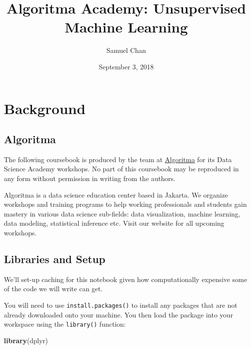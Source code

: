 \documentclass[]{article}
\title{Algoritma Academy: Unsupervised Machine Learning}
\author{Samuel Chan}
\date{September 3, 2018}
\newenvironment{Shaded}{\begin{snugshade}}{\end{snugshade}}
\newcommand{\DataTypeTok}[1]{\textcolor[rgb]{0.13,0.29,0.53}{#1}}
\newcommand{\DecValTok}[1]{\textcolor[rgb]{0.00,0.00,0.81}{#1}}
\newcommand{\KeywordTok}[1]{\textcolor[rgb]{0.13,0.29,0.53}{\textbf{#1}}}
\newcommand{\NormalTok}[1]{#1}
\newcommand{\OperatorTok}[1]{\textcolor[rgb]{0.81,0.36,0.00}{\textbf{#1}}}
\newcommand{\OtherTok}[1]{\textcolor[rgb]{0.56,0.35,0.01}{#1}}
\begin{document}
\maketitle

\hypertarget{background}{%
\section{Background}\label{background}}

\hypertarget{algoritma}{%
\subsection{Algoritma}\label{algoritma}}

The following coursebook is produced by the team at
\href{https://algorit.ma}{Algoritma} for its Data Science Academy
workshops. No part of this coursebook may be reproduced in any form
without permission in writing from the authors.

Algoritma is a data science education center based in Jakarta. We
organize workshops and training programs to help working professionals
and students gain mastery in various data science sub-fields: data
visualization, machine learning, data modeling, statistical inference
etc. Visit our website for all upcoming workshops.

\hypertarget{libraries-and-setup}{%
\subsection{Libraries and Setup}\label{libraries-and-setup}}

We'll set-up caching for this notebook given how computationally
expensive some of the code we will write can get.

\begin{Shaded}
\end{Shaded}

You will need to use \texttt{install.packages()} to install any packages
that are not already downloaded onto your machine. You then load the
package into your workspace using the \texttt{library()} function:

\begin{Shaded}
\begin{Highlighting}[]
\KeywordTok{library}\NormalTok{(dplyr)}
\end{Highlighting}
\end{Shaded}
\end{document}
